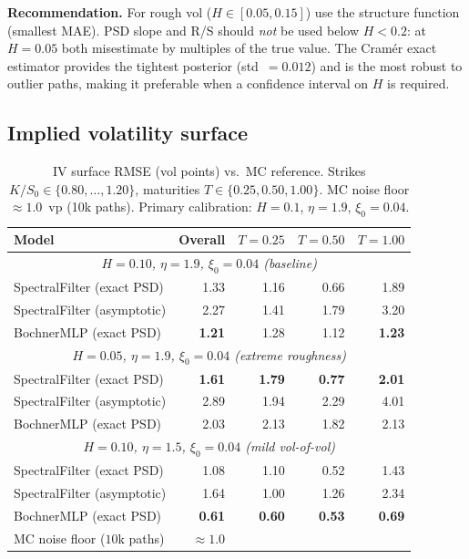 \documentclass[11pt,a4paper]{article}
\begin{document}
\textbf{Recommendation.} For rough vol ($H \in [0.05, 0.15]$) use the
structure function (smallest MAE).  PSD slope and R/S should \emph{not}
be used below $H < 0.2$: at $H=0.05$ both misestimate by multiples of
the true value.  The Cram\'er exact estimator provides the tightest
posterior (std~$=0.012$) and is the most robust to outlier paths, making
it preferable when a confidence interval on $H$ is required.

\subsection{Implied volatility surface}

\begin{table}[h]
\centering
\caption{IV surface RMSE (vol points) vs.\ MC reference.
Strikes $K/S_0 \in \{0.80, \ldots, 1.20\}$, maturities $T \in
\{0.25, 0.50, 1.00\}$. MC noise floor $\approx 1.0$~vp (10k paths).
Primary calibration: $H=0.1$, $\eta=1.9$, $\xi_0=0.04$.}
\label{tab:iv-rmse}
\begin{tabular}{lrrrr}
\toprule
Model & Overall & $T=0.25$ & $T=0.50$ & $T=1.00$ \\
\midrule
\multicolumn{5}{c}{\textit{$H=0.10$, $\eta=1.9$, $\xi_0=0.04$ (baseline)}} \\
SpectralFilter (exact PSD) & 1.33 & 1.16 & 0.66 & 1.89 \\
SpectralFilter (asymptotic) & 2.27 & 1.41 & 1.79 & 3.20 \\
BochnerMLP (exact PSD)   & \textbf{1.21} & 1.28 & 1.12 & \textbf{1.23} \\
\midrule
\multicolumn{5}{c}{\textit{$H=0.05$, $\eta=1.9$, $\xi_0=0.04$ (extreme roughness)}} \\
SpectralFilter (exact PSD) & \textbf{1.61} & \textbf{1.79} & \textbf{0.77} & \textbf{2.01} \\
SpectralFilter (asymptotic) & 2.89 & 1.94 & 2.29 & 4.01 \\
BochnerMLP (exact PSD)   & 2.03 & 2.13 & 1.82 & 2.13 \\
\midrule
\multicolumn{5}{c}{\textit{$H=0.10$, $\eta=1.5$, $\xi_0=0.04$ (mild vol-of-vol)}} \\
SpectralFilter (exact PSD) & 1.08 & 1.10 & 0.52 & 1.43 \\
SpectralFilter (asymptotic) & 1.64 & 1.00 & 1.26 & 2.34 \\
BochnerMLP (exact PSD)   & \textbf{0.61} & \textbf{0.60} & \textbf{0.53} & \textbf{0.69} \\
\midrule
MC noise floor ($10$k paths) & $\approx 1.0$ &  &  &  \\
\bottomrule
\end{tabular}
\end{table}
\end{document}
